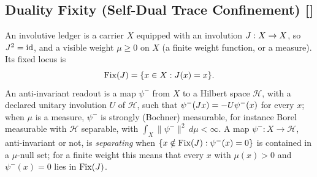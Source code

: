 \subsection{Duality Fixity (Self-Dual Trace Confinement) [\texorpdfstring{}{F14}]}\label{sec:symmetry:duality-fixity}

\begin{definition}\label{def:involutive-ledger}
An involutive ledger is a carrier \(X\) equipped with an involution
\(J:X\to X\), so \(J^2=\mathrm{id}\), and a visible weight
\(\mu\ge 0\) on \(X\) (a finite weight function, or a measure).  Its fixed
locus is
\[
  \mathrm{Fix}(J)=\{x\in X:J(x)=x\}.
\]
An anti-invariant readout is a map \(\psi^-\) from \(X\) to a Hilbert space
\(\mathcal H\), with a declared unitary involution \(U\) of \(\mathcal H\), such
that \(\psi^-(J x)=-U\psi^-(x)\) for every \(x\); when \(\mu\) is a
measure, \(\psi^-\) is strongly (Bochner) measurable, for instance Borel measurable with
\(\mathcal H\) separable, with \(\int_X\|\psi^-\|^2\,d\mu<\infty\).
A map \(\psi^-:X\to\mathcal H\), anti-invariant or not, is \emph{separating} when \(\{x\notin\mathrm{Fix}(J):\psi^-(x)=0\}\) is contained in a
\(\mu\)-null set; for a finite weight this means that
every \(x\) with \(\mu(x)>0\) and \(\psi^-(x)=0\) lies in \(\mathrm{Fix}(J)\).
\end{definition}

